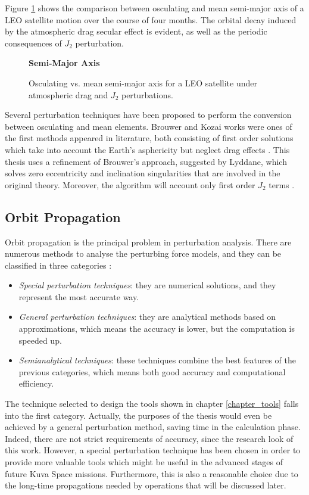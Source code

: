Figure \ref{osc_vs_mean_sma} shows the comparison between osculating and mean semi-major axis of a LEO satellite motion over the course of four months.
The orbital decay induced by the atmospheric drag secular effect is evident, as well as the periodic consequences of $J_2$ perturbation.
\begin{figure}[h] 
    \begin{center}
        \textbf{Semi-Major Axis}\par\medskip
    \end{center}
    \caption{Osculating vs. mean semi-major axis for a LEO satellite under atmospheric drag and $J_2$ perturbations.}
    \label{osc_vs_mean_sma}
\end{figure}

Several perturbation techniques have been proposed to perform the conversion between osculating and mean elements. 
Brouwer and Kozai works were ones of the first methods appeared in literature, both consisting of first order solutions which take into account the Earth's asphericity but neglect drag effects \cite{arnas2022analytic}.
This thesis uses a refinement of Brouwer's approach, suggested by Lyddane, which solves zero eccentricity and inclination singularities that are involved in the original theory.
Moreover, the algorithm will account only first order $J_2$ terms \cite{schaub2002analytical}.

\subsection{Orbit Propagation}
Orbit propagation is the principal problem in perturbation analysis.
There are numerous methods to analyse the perturbing force models, and they can be classified in three categories  \cite{vallado2013fundamentals}:
\begin{itemize}
    \item \textit{Special perturbation techniques}: they are numerical solutions, and they represent the most accurate way.
    \item \textit{General perturbation techniques}: they are analytical methods based on approximations, which means the accuracy is lower, but the computation is speeded up.
    \item \textit{Semianalytical techniques}: these techniques combine the best features of the previous categories, which means both good accuracy and computational efficiency.
\end{itemize}
The technique selected to design the tools shown in chapter \ref{chapter_tools} falls into the first category.
Actually, the purposes of the thesis would even be achieved by a general perturbation method, saving time in the calculation phase.
Indeed, there are not strict requirements of accuracy, since the research look of this work.
However, a special perturbation technique has been chosen in order to provide more valuable tools which might be useful in the advanced stages of future Kuva Space missions.
Furthermore, this is also a reasonable choice due to the long-time propagations needed by operations that will be discussed later.

